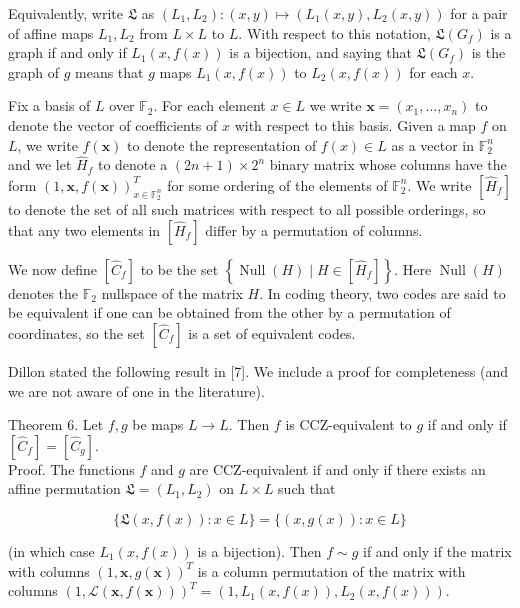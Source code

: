 \documentclass[10pt]{article}
\begin{document}
Equivalently, write $\mathfrak{L}$ as $\left(L_{1}, L_{2}\right):(x, y) \mapsto\left(L_{1}(x, y), L_{2}(x, y)\right)$ for a pair of affine maps $L_{1}, L_{2}$ from $L \times L$ to $L$. With respect to this notation, $\mathfrak{L}\left(G_{f}\right)$ is a graph if and only if $L_{1}(x, f(x))$ is a bijection, and saying that $\mathfrak{L}\left(G_{f}\right)$ is the graph of $g$ means that $g$ maps $L_{1}(x, f(x))$ to $L_{2}(x, f(x))$ for each $x$.

Fix a basis of $L$ over $\mathbb{F}_{2}$. For each element $x \in L$ we write $\mathbf{x}=\left(x_{1}, \ldots, x_{n}\right)$ to denote the vector of coefficients of $x$ with respect to this basis. Given a map $f$ on $L$, we write $f(\mathbf{x})$ to denote the representation of $f(x) \in L$ as a vector in $\mathbb{F}_{2}^{n}$ and we let $\widehat{H}_{f}$ to denote a $(2 n+1) \times 2^{n}$ binary matrix whose columns have the form $(1, \mathbf{x}, f(\mathbf{x}))_{x \in \mathbb{F}_{2}^{n}}^{T}$ for some ordering of the elements of $\mathbb{F}_{2}^{n}$. We write $\left[\widehat{H}_{f}\right]$ to denote the set of all such matrices with respect to all possible orderings, so that any two elements in $\left[\widehat{H}_{f}\right]$ differ by a permutation of columns.

We now define $\left[\widehat{C}_{f}\right]$ to be the set $\left\{\operatorname{Null}(H) \mid H \in\left[\widehat{H}_{f}\right]\right\}$. Here $\operatorname{Null}(H)$ denotes the $\mathbb{F}_{2}$ nullspace of the matrix $H$. In coding theory, two codes are said to be equivalent if one can be obtained from the other by a permutation of coordinates, so the set $\left[\widehat{C}_{f}\right]$ is a set of equivalent codes.

Dillon stated the following result in [7]. We include a proof for completeness (and we are not aware of one in the literature).

Theorem 6. Let $f, g$ be maps $L \rightarrow L$. Then $f$ is CCZ-equivalent to $g$ if and only if $\left[\widehat{C}_{f}\right]=\left[\widehat{C}_{g}\right]$.\\
Proof. The functions $f$ and $g$ are CCZ-equivalent if and only if there exists an affine permutation $\mathfrak{L}=\left(L_{1}, L_{2}\right)$ on $L \times L$ such that

$$
\{\mathfrak{L}(x, f(x)): x \in L\}=\{(x, g(x)): x \in L\}
$$

(in which case $L_{1}(x, f(x))$ is a bijection). Then $f \sim g$ if and only if the matrix with columns $(1, \mathbf{x}, g(\mathbf{x}))^{T}$ is a column permutation of the matrix with columns $(1, \mathscr{L}(\mathbf{x}, f(\mathbf{x})))^{T}= \left(1, L_{1}(x, f(x)), L_{2}(x, f(x))\right)$.
\end{document}
